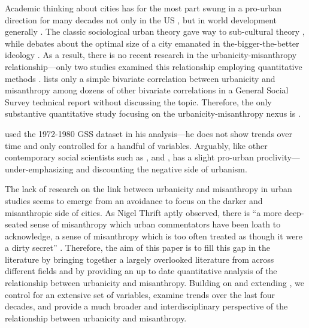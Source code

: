 \documentclass[11pt, letterpaper]{article}
\begin{document}
\begin{spacing}{1.4}
Academic thinking about cities has for the most part swung in a pro-urban direction for many decades not only in the US \citep{hansonCityJournalautumn15}, but in world development generally \citep{lipton77}. The classic sociological urban theory \citep{wirth38,milgram70,park15,park84,simmel03,tonnies57} gave way to
  sub-cultural theory \citep{fischer75,fischer95,wilson85, palisi83}, while debates about the optimal size of a city \citep{richardson72,singell74,alonso60,alonso71,elgin75,capello00} emanated in the-bigger-the-better ideology \citep{glaeser11}. As a result, there is no recent research in the urbanicity-misanthropy relationship---only two studies examined this relationship employing quantitative methods \citep{wilson85,smith97}. \citet{smith97} lists only a simple bivariate correlation between urbanicity and misanthropy among dozens of other bivariate correlations in a General Social Survey technical report without discussing the topic. 
Therefore, the only substantive quantitative study focusing on the urbanicity-misanthropy nexus is \citet{wilson85}.%


\citet{wilson85} used the 1972-1980 GSS dataset in his analysis---he does not show trends over time and only controlled for a handful of variables.  Arguably, like other
contemporary social scientists such as \citet[][]{veenhoven94}, \citet[][]{meyer13} and \citet[][]{fischer82}, \citeauthor{wilson85} has a slight pro-urban
proclivity---under-emphasizing and discounting the negative side of urbanism.  

The lack of research on the link between urbanicity and misanthropy in urban studies
seems to emerge from an avoidance to focus on the darker and misanthropic side
of cities. As Nigel Thrift aptly observed, there is ``a more deep-seated sense of misanthropy which urban commentators have been loath to acknowledge, a sense of misanthropy which is too often treated as though it were a dirty secret'' \citep[p. 134]{thrift05}. Therefore, the aim of this paper is to fill this gap in the literature by
bringing together a largely overlooked literature from across different fields and
by providing an up to date quantitative analysis of the relationship between
urbanicity and misanthropy. Building on and extending \citet{wilson85}, we control for an extensive set of variables, examine trends over the last four decades, and provide a much broader and interdisciplinary perspective of the relationship between urbanicity and misanthropy. 



\end{spacing}
\end{document}
